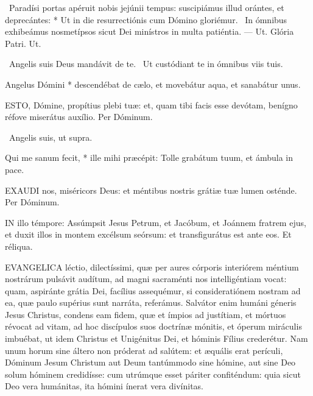 \R\ Paradísi portas apéruit nobis jejúnii tempus: suscipiámus illud orántes, et deprecántes: * Ut in die resurrectiónis cum Dómino gloriémur. \V\ In ómnibus exhibeámus nosmetípsos sicut Dei minístros in multa patiéntia. --- Ut. Glória Patri. Ut.

\V\ Angelis suis Deus mandávit de te. \R\ Ut custódiant te in ómnibus viis tuis.

 Angelus Dómini * descendébat de cælo, et movebátur aqua, et sanabátur unus.


\lettrine[lines=2]{E}{STO}, Dómine, propítius plebi tuæ: et, quam tibi facis esse devótam, benígno réfove miserátus auxílio. Per Dóminum.

\V\ Angelis suis, ut supra.

 Qui me sanum fecit, * ille mihi præcépit: Tolle grabátum tuum, et ámbula in pace.


\lettrine[lines=2]{E}{XAUDI} nos, miséricors Deus: et méntibus nostris grátiæ tuæ lumen osténde. Per Dóminum.

\sectionornament




\lettrine[lines=2]{I}{N} illo témpore: Assúmpsit Jesus Petrum, et Jacóbum, et Joánnem fratrem ejus, et duxit illos in montem excélsum seórsum: et transfigurátus est ante eos. Et réliqua.



\lettrine[lines=2]{E}{VANGELICA} léctio, dilectíssimi, quæ per aures córporis interiórem méntium nostrárum pulsávit audítum, ad magni sacraménti nos intelligéntiam vocat: quam, aspiránte grátia Dei, facílius assequémur, si consideratiónem nostram ad ea, quæ paulo supérius sunt narráta, referámus. Salvátor enim humáni géneris Jesus Christus, condens eam fidem, quæ et ímpios ad justítiam, et mórtuos révocat ad vitam, ad hoc discípulos suos doctrínæ mónitis, et óperum miráculis imbuébat, ut idem Christus et Unigénitus Dei, et hóminis Fílius crederétur. Nam unum horum sine áltero non próderat ad salútem: et æquális erat perículi, Dóminum Jesum Christum aut Deum tantúmmodo sine hómine, aut sine Deo solum hóminem credidísse: cum utrúmque esset páriter confiténdum: quia sicut Deo vera humánitas, ita hómini ínerat vera divínitas.

